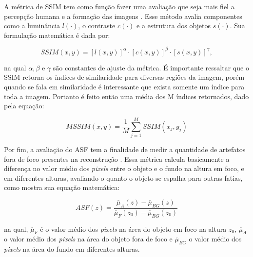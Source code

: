 A métrica de \acs{SSIM} tem como função fazer uma avaliação que seja mais fiel a percepção humana e a formação das imagens \cite[]{wang2004image}. Esse método avalia componentes como a  luminância $l(\cdot)$, o contraste $c(\cdot)$ e a estrutura dos objetos $s(\cdot)$. Sua formulação matemática é dada por:

\begin{equation}
SSIM(x,y) = [l(x,y)]^{\alpha} \cdot [c(x,y)]^{\beta} \cdot [s(x,y)]^{\gamma},
\label{eq:eqCap4SSIM}
\end{equation}

\noindent na qual $\alpha,\beta \text{ e } \gamma$ são constantes de ajuste da métrica. É importante ressaltar que o \acs{SSIM} retorna os índices de similaridade para diversas regiões da imagem, porém quando se fala em similaridade é interessante que exista somente um índice para toda a imagem. Portanto é feito então uma média dos M índices retornados, dado pela equação:

\begin{equation}
MSSIM(x,y) = \dfrac{1}{M} \sum_{j=1}^{M} SSIM(x_{j},y_{j})
\label{eq:eqCap4MSSIM}
\end{equation} 

Por fim, a avaliação do \acs{ASF} tem a finalidade de medir a quantidade de artefatos fora de foco presentes na reconstrução \cite{zhang2006comparative,borges2017metal}. Essa métrica calcula basicamente a diferença no valor médio dos \textit{pixels} entre o objeto e o fundo na altura em foco, e em diferentes alturas, avaliando o quanto o objeto se espalha para outras fatias, como mostra sua equação matemática:

\begin{equation}
ASF(z) = \dfrac{\overbar{\mu}_{A}(z) - \overbar{\mu}_{BG}(z)}{\overbar{\mu}_{F}(z_{0}) - \overbar{\mu}_{BG}(z_{0})}
\label{eq:eqCap4ASF}
\end{equation} 

\noindent na qual, $\overbar{\mu}_{F}$ é o valor médio dos \textit{pixels} na área do objeto em foco na altura $z_{0}$, $\overbar{\mu}_{A}$ o valor médio dos \textit{pixels} na área do objeto fora de foco e $\overbar{\mu}_{BG}$ o valor médio dos \textit{pixels} na área do fundo em diferentes alturas.

